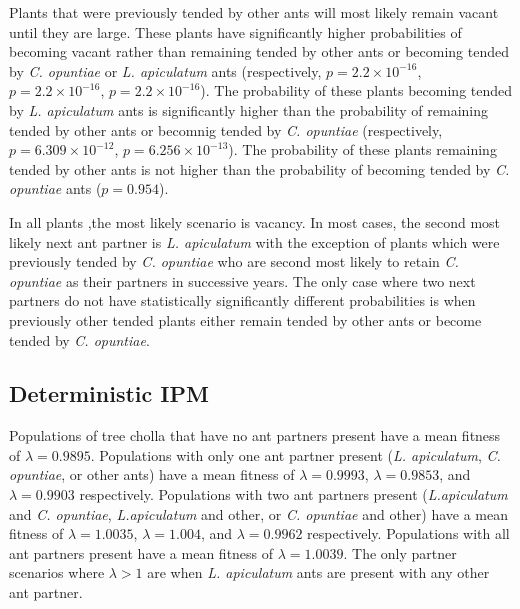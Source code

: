\documentclass[11pt]{article}
\begin{document}
{{%
Plants that were previously tended by other ants will most likely remain vacant until they are large. 
These plants have significantly higher probabilities of becoming vacant rather than remaining tended by other ants or becoming tended by \textit{C. opuntiae} or \textit{L. apiculatum} ants (respectively, $p = 2.2 \times 10^{-16}$, $p = 2.2 \times 10^{-16}$, $p = 2.2 \times 10^{-16}$).
The probability of these plants becoming tended by \textit{L. apiculatum} ants is significantly higher than the probability of remaining tended by other ants or becomnig tended by \textit{C. opuntiae} (respectively, $p = 6.309 \times 10^{-12}$, $p = 6.256 \times 10^{-13}$).
The probability of these plants remaining tended by other ants is not higher than the probability of becoming tended by \textit{C. opuntiae} ants ($p = 0.954$). 

In all plants ,the most likely scenario is vacancy.
In most cases, the second most likely next ant partner is \textit{L. apiculatum} with the exception of plants which were previously tended by \textit{C. opuntiae} who are second most likely to retain \textit{C. opuntiae} as their partners in successive years.
The only case where two next partners do not have statistically significantly different probabilities is when previously other tended plants either remain tended by other ants or become tended by \textit{C. opuntiae}. 

\subsection*{Deterministic IPM}

Populations of tree cholla that have no ant partners present have a mean fitness of $\lambda = 0.9895$.
Populations with only one ant partner present (\textit{L. apiculatum}, \textit{C. opuntiae}, or other ants) have a mean fitness of $\lambda = 0.9993$, $\lambda = 0.9853$, and $\lambda = 0.9903$ respectively.
Populations with two ant partners present (\textit{L.apiculatum} and \textit{C. opuntiae}, \textit{L.apiculatum} and other, or \textit{C. opuntiae} and other) have a mean fitness of $\lambda = 1.0035$, $\lambda = 1.004$, and $\lambda = 0.9962$ respectively. 
Populations with all ant partners present have a mean fitness of $\lambda = 1.0039$.
The only partner scenarios where $\lambda > 1$ are when \textit{L. apiculatum} ants are present with any other ant partner. 

}}
\end{document}
